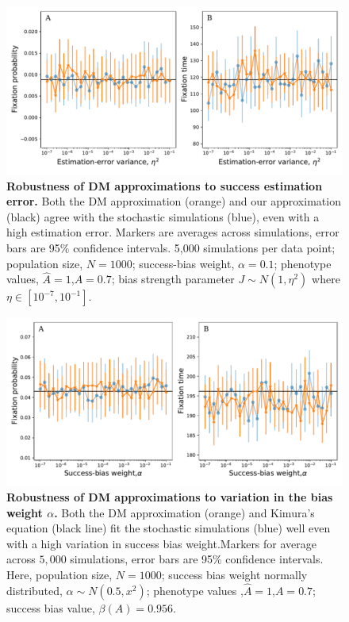 \documentclass[12pt]{extarticle}
\begin{document}
\begin{figure}
    \includegraphics[width=\linewidth]{../figures/final/full_vs_dm_mutation.pdf}
  \caption{
  \textbf{Robustness of DM approximations to success estimation error.}
  Both the DM approximation (orange) and our approximation (black) agree with the stochastic simulations (blue), even with a high estimation error.
  Markers are averages across simulations, error bars are 95\% confidence intervals.
  5,000 simulations per data point; population size, $N=1000$; success-bias weight, $\alpha=0.1$; phenotype values, $\hat{A}=1$,$A=0.7$; bias strength parameter $J\sim N(1,\eta^2)$ where $\eta \in [10^{-7},10^{-1}]$.
  }	
  \label{fig:hetro_error}
\end{figure}


\begin{figure}
    \includegraphics[width=\linewidth]{../figures/final/full_vs_dm_changing_alpha.pdf}
   \caption{\textbf{Robustness of DM approximations to variation in the bias weight $\alpha$.} 
   Both the DM approximation (orange) and Kimura's equation (black line) fit the stochastic simulations (blue) well even with a high variation in success bias weight.Markers for average across $5,000$ simulations, error bars are 95\% confidence intervals.
  Here, population size, $N=1000$; success bias weight normally distributed, $\alpha\sim N(0.5,x^2)$; phenotype values ,$\hat{A}=1$,$A=0.7$; success bias value, $\beta(A)=0.956$.}	
  \label{fig:hetro_alpha}
\end{figure}
\end{document}
